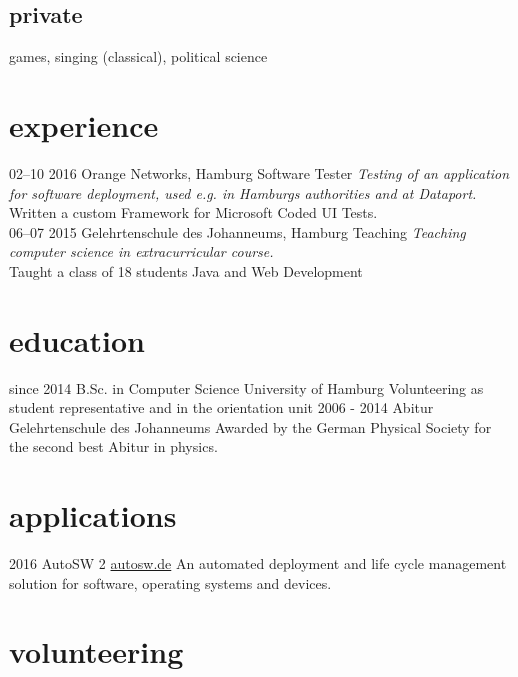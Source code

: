 \documentclass[]{friggeri-cv}
\begin{document}
  \subsection{private}
    games, singing (classical), political science


\section{experience}

\begin{entrylist}
  \entry
    {02–10 2016}
    {Orange Networks, Hamburg}
    {Software Tester}
    {\emph{Testing of an application for software deployment, used e.g. in Hamburgs authorities and at Dataport.}\\
    Written a custom Framework for Microsoft Coded UI Tests.} \\
  \entry
    {06–07 2015}
    {Gelehrtenschule des Johanneums, Hamburg}
    {Teaching}
    {\emph{Teaching computer science in extracurricular course.}\\
    Taught a class of 18 students Java and Web Development}
\end{entrylist}

\section{education}

\begin{entrylist}
  \entry
    {since 2014}
    {B.Sc. {\normalfont in Computer Science}}
    {University of Hamburg}
    {Volunteering as student representative and in the orientation unit}
  \entry
    {2006 - 2014}
    {Abitur}
    {Gelehrtenschule des Johanneums}
    {Awarded by the German Physical Society for the second best Abitur in physics.}
\end{entrylist}

\section{applications}

\begin{entrylist}
 \entry
    {2016}
    {AutoSW 2}
    {\href{https://www.autosw.de/Demo/Benefit}{autosw.de}}
    {An automated deployment and life cycle management solution for software, operating systems and devices.}
\end{entrylist}

\section{volunteering}
\end{document}
